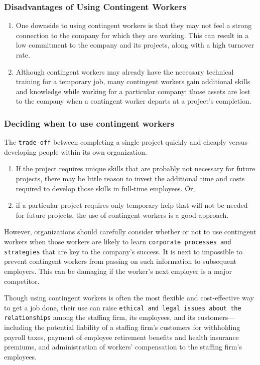 \documentclass[11pt]{article}
\begin{document}
\subsubsection{Disadvantages of Using Contingent Workers}
\label{sec:orgf5f1bcb}
\begin{enumerate}
\item One downside to using contingent workers is that they may not feel a strong connection to the company for which they are working. This can result in a low commitment to the company and its projects, along with a high turnover rate.

\item Although contingent workers may already have the necessary technical training for a temporary job, many contingent workers gain additional skills and knowledge while working for a particular company; those assets are lost to the company when a contingent worker departs at a project’s completion.
\end{enumerate}

\subsubsection{Deciding when to use contingent workers}
\label{sec:org65f7b7a}
The \texttt{trade-off} between completing a single project quickly and cheaply versus developing people within its own organization.

\begin{enumerate}
\item If the project requires unique skills that are probably not necessary for future projects, there may be little reason to invest the additional time and costs required to develop those skills in full-time employees. Or,
\item if a particular project requires only temporary help that will not be needed for future projects, the use of contingent workers is a good approach.
\end{enumerate}


However, organizations should carefully consider whether or not to use contingent workers when those workers are likely to learn \texttt{corporate processes and strategies} that are key to the company’s success. It is next to impossible to prevent contingent workers from passing on such information to subsequent employers. This can be damaging if the worker’s next employer is a major competitor.

Though using contingent workers is often the most flexible and cost-effective way to get a job done, their use can raise \texttt{ethical and legal issues about the relationships} among the staffing firm, its employees, and its customers—including the potential liability of a staffing firm’s customers for withholding payroll taxes, payment of employee retirement benefits and health insurance premiums, and administration of workers’ compensation to the staffing firm’s employees.
\end{document}
